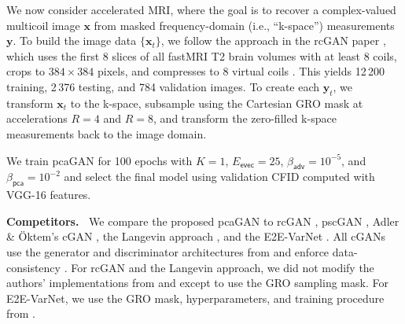 \documentclass{article}
\theoremstyle{plain}
\theoremstyle{definition}
\theoremstyle{remark}
\newcommand{\defn}{\triangleq}
\renewcommand{\vec}[1]{\ensuremath{\boldsymbol{#1}}}
\newcommand{\mc}[1]{\ensuremath{\mathcal{#1}}}
\DeclareMathOperator{\E}{E}
\renewcommand{\eqref}[1]{(\ref{eq:#1})}
\newcommand{\secref}[1]{Sec.~\ref{sec:#1}}
\newcommand{\train}{_{\mathsf{rc}}}
\newcommand{\evec}{_{\mathsf{evec}}}
\newcommand{\Dadler}{D^{\mathsf{adler}}}
\newcommand{\Ladler}{\mc{L}^{\mathsf{adler}}_{\mathsf{adv}}}
\newcommand{\Lgp}{\mc{L}_{\mathsf{gp}}}
\newcommand{\Ldrift}{\mc{L}_{\mathsf{drift}}}
\newcommand{\betaadv}{\beta_{\mathsf{adv}}}
\newcommand{\betapca}{\beta_{\mathsf{pca}}}
\newcommand{\Exzzy}{\E_{\mathsf{x,z_1,z_2,y}}}
\begin{document}

We now consider accelerated MRI, where the goal is to recover a complex-valued multicoil image $\vec{x}$ from masked frequency-domain (i.e., ``k-space'') measurements $\vec{y}$. 
To build the image data $\{\vec{x}_t\}$, we follow the approach in the rcGAN paper \cite{Bendel:NIPS:23}, which uses the first 8 slices of all fastMRI \cite{Zbontar:18} T2 brain volumes with at least 8 coils, crops to $384 \times 384$ pixels, and compresses to 8 virtual coils \cite{Zhang:MRM:13}. 
This yields 12\,200 training, 2\,376 testing, and 784 validation images.
To create each $\vec{y}_t$, we transform $\vec{x}_t$ to the k-space, subsample using the Cartesian GRO mask \cite{Joshi:22} at accelerations $R=4$ and $R=8$, and transform the zero-filled k-space measurements back to the image domain.

We train pcaGAN for 100 epochs with $K=1$, $E\evec=25$, $\betaadv=10^{-5}$, and $\betapca=10^{-2}$ and select the final model using validation CFID computed with VGG-16 features.

\textbf{Competitors.~} 
We compare the proposed pcaGAN to rcGAN \cite{Bendel:NIPS:23}, pscGAN \cite{Ohayon:ICCVW:21}, Adler \& \"Oktem's cGAN \cite{Adler:18}, the Langevin approach \cite{Jalal:NIPS:21}, and the E2E-VarNet \cite{Sriram:MICCAI:20}.
All cGANs use the generator and discriminator architectures from \cite{Bendel:NIPS:23}
and enforce data-consistency \cite{Sonderby:ICLR:17}.
For rcGAN and the Langevin approach, we did not modify the authors' implementations from \cite{Bendel:github:23} and \cite{Jalal:github:21} except to use the GRO sampling mask.
For E2E-VarNet, we use the GRO mask, hyperparameters, and training procedure from \cite{Jalal:NIPS:21}.
\end{document}

